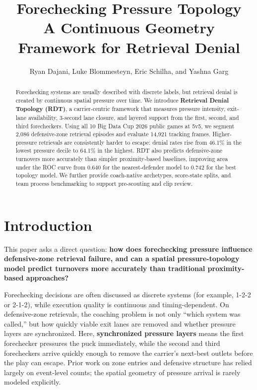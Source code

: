 \documentclass[10pt]{article}
\title{\textbf{Forechecking Pressure Topology}\\A Continuous Geometry Framework for Retrieval Denial}
\author{Ryan Dajani, Luke Blommesteyn, Eric Schilha, and Yashna Garg}
\date{}
\begin{document}
\maketitle
\vspace{-1.1em}

\begin{abstract}
Forechecking systems are usually described with discrete labels, but retrieval denial is created by continuous spatial pressure over time. We introduce \textbf{Retrieval Denial Topology (RDT)}, a carrier-centric framework that measures pressure intensity, exit-lane availability, 3-second lane closure, and layered support from the first, second, and third forecheckers. Using all 10 Big Data Cup 2026 public games at 5v5, we segment 2{,}086 defensive-zone retrieval episodes and evaluate 14{,}921 tracking frames. Higher-pressure retrievals are consistently harder to escape: denial rates rise from 46.1\% in the lowest pressure decile to 64.1\% in the highest. RDT also predicts defensive-zone turnovers more accurately than simpler proximity-based baselines, improving area under the ROC curve from 0.640 for the nearest-defender model to 0.742 for the best topology model. We further provide coach-native archetypes, score-state splits, and team process benchmarking to support pre-scouting and clip review.
\end{abstract}

\section{Introduction}
This paper asks a direct question: \textbf{how does forechecking pressure influence defensive-zone retrieval failure, and can a spatial pressure-topology model predict turnovers more accurately than traditional proximity-based approaches?}

Forechecking decisions are often discussed as discrete systems (for example, 1-2-2 or 2-1-2), while execution quality is continuous and timing-dependent. On defensive-zone retrievals, the coaching problem is not only ``which system was called,'' but how quickly viable exit lanes are removed and whether pressure layers are synchronized. Here, \textbf{synchronized pressure layers} means the first forechecker pressures the puck immediately, while the second and third forecheckers arrive quickly enough to remove the carrier's next-best outlets before the play can escape. Prior work on zone entries and defensive structure has relied largely on event-level counts; the spatial geometry of pressure arrival is rarely modeled explicitly.
\end{document}
